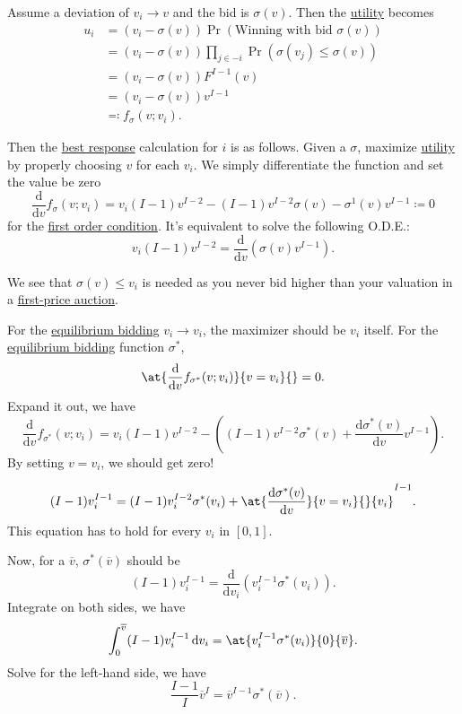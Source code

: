 Assume a deviation of \(v_{i}\to v\) and the bid is \(\sigma(v)\). Then the \hyperref[def:reward]{utility}  becomes
\[
	\begin{split}
		u_{i} &= (v_{i} - \sigma(v))\Pr( \text{Winning with bid } \sigma(v))\\
		&= (v_{i} - \sigma(v))\prod\limits_{j\in -i}\Pr(\sigma(v_{j})\leq \sigma(v))\\
		&= (v_{i} - \sigma(v))F^{I-1}(v)\\
		&= (v_{i} - \sigma(v))v^{I-1}\\
		&\eqqcolon f_{\sigma}(v; v_{i}).
	\end{split}
\]

Then the \hyperref[def:best-response]{best response} calculation for \(i\) is as follows. Given a \(\sigma\), maximize \hyperref[def:reward]{utility}
by properly choosing \(v\) for each \(v_{i}\). We simply differentiate the function and set the value be zero
\[
	\frac{\mathrm{d}}{\mathrm{d}v}f_{\sigma}(v;v_{i}) = v_{i}(I - 1)v^{I-2} - (I - 1)v^{I-2}\sigma(v) - \sigma^1(v)v^{I-1} \coloneqq 0
\]
for the \underline{first order condition}. It's equivalent to solve the following O.D.E.:
\[
	v_{i}(I - 1)v^{I-2} = \frac{\mathrm{d}}{\mathrm{d}v} (\sigma(v)v^{I-1}).
\]

We see that \(\sigma(v)\leq v_{i}\) is needed as you never bid higher than your valuation in a \hyperref[eg:first-price-auction]{first-price auction}.

For the \hyperref[rmk:equilibrium-bidding]{equilibrium bidding} \(v_{i}\to v_{i}\), the maximizer should be \(v_{i}\) itself. For the
\hyperref[rmk:equilibrium-bidding]{equilibrium bidding} function \(\sigma^{\ast}\),
\[
	\at{\frac{\mathrm{d}}{\mathrm{d}v} f_{\sigma^{\ast}}(v;v_{i})}{v = v_{i}}{} = 0.
\]
Expand it out, we have
\[
	\frac{\mathrm{d}}{\mathrm{d}v} f_{\sigma^{\ast}}(v;v_{i}) = v_{i}(I - 1)v^{I-2} - \left((I - 1)v^{I-2}\sigma^{\ast}(v) + \frac{\mathrm{d}\sigma^{\ast}(v)}{\mathrm{d}v} v^{I-1}\right).
\]
By setting \(v = v_{i}\), we should get zero!

\[
	(I - 1)v_{i}^{I-1} = (I - 1)v_{i}^{I-2}\sigma^{\ast}(v_{i})+\at{\frac{\mathrm{d}\sigma^{\ast}(v)}{\mathrm{d}v}}{v = v_{i}}{}{v_{i}}^{I-1}.
\]
This equation has to hold for every \(v_{i}\) in \([0, 1]\).

Now, for a \(\overline{v}\), \(\sigma^{\ast}(\overline{v})\) should be
\[
	(I - 1)v_{i}^{I-1} = \frac{\mathrm{d}}{\mathrm{d}v_{i}} \left(v_{i}^{I-1}\sigma^{\ast}(v_{i})\right).
\]
Integrate on both sides, we have
\[
	\int_0^{\overline{v}}(I - 1)v_{i}^{I-1}\,\mathrm{d} v_{i} = \at{v_{i}^{I-1}\sigma^{\ast}(v_{i})}{0}{\overline{v}}.
\]
Solve for the left-hand side, we have
\[
	\frac{I - 1}{I}\overline{v}^I = \overline{v}^{I-1}\sigma^{\ast}(\overline{v}).
\]

